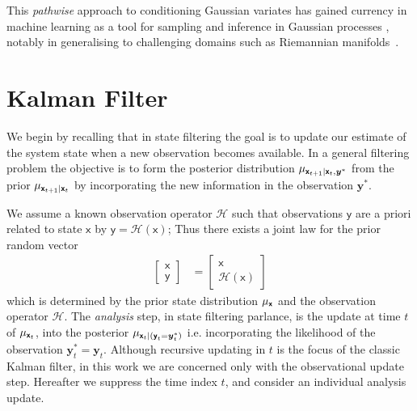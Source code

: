 \documentclass[wcp]{jmlr} %
\newcommand{\vv}[1]{\boldsymbol{#1}}
\newcommand{\rv}[1]{\mathsf{#1}}
\newcommand{\vrv}[1]{\vv{\rv{#1}}}
\newcommand{\op}[1]{\mathcal{#1}}
\newcommand{\gvn}{\mid}
\begin{document}
This \emph{pathwise} approach to conditioning Gaussian variates has gained currency in machine learning as a tool for sampling and inference in Gaussian processes \citep{Wilson2020Efficiently,Wilson2021Pathwise}, notably in generalising to challenging domains such as Riemannian manifolds~\citep{Borovitskiy2023Matern}.

\section{Kalman Filter}
We begin by recalling that in state filtering the goal is to update our estimate of the system state when a new observation becomes available. In a general filtering problem the objective is to form the posterior distribution \(\Law[\vrv{x}_{t+1} \gvn \vrv{x}_t, \vv{y}^*]\) from the prior \(\Law[\vrv{x}_{t+1} \gvn \vrv{x}_t]\) by incorporating the new information in the observation \(\vv{y}^*\).

We assume a known observation operator $\op{H}$ such that observations $\vrv{y}$ are a priori related to state $\vrv{x}$ by $\vrv{y}=\op{H}(\vrv{x})$; Thus there exists a joint law for the prior random vector
\begin{align}
    \begin{bmatrix}
        \vrv{x}\\
        \vrv{y}
    \end{bmatrix} &= \begin{bmatrix}
        \vrv{x}\\
        \op{H}(\vrv{x})
    \end{bmatrix}\label{eq:joint-law}
\end{align}
which is determined by the prior state distribution $\Law[\vrv{x}]$ and the observation operator $\op{H}$.
The  \emph {analysis} step, in state filtering parlance, is the update at time $t$ of  \(\Law[\vrv{x}_{t}]\), into the posterior \( \Law[\vrv{x}_t \gvn (\vrv{y}_t{=}\vv{y}_t^*)]\)
i.e. incorporating the likelihood of the observation $\vv{y}_t^*=\vv{y}_t$.
Although  recursive updating in $t$ is the focus of the classic Kalman filter, in this work we are concerned only with the observational update step.
Hereafter we suppress the time index $t$, and consider an individual analysis update.
\end{document}
